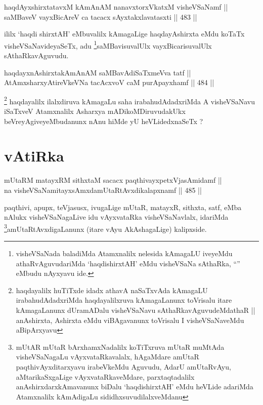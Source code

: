 
\begin{shl}
haqdAyxshirxtatavxM kAmAnAM nanavxtorxVkatxM visheVSaNamf || \\
saMBaveV vayxBicAreV ca tacacx sAyxtakxlavatasxti ||  483 ||  
\end{shl}

\begin{artha}
ililx `haqdi shirxtAH' eMbuvalilx kAmagaLige haqdayAshirxta eMdu
koTaTx visheVSaNavideyaSeTx, adu \footnote{visheVSaNada baladiMda
  Atamxnalilx nelesida kAmagaLU iveyeMdu athaRvAguvudariMda
  `haqdishirxtAH' eMdu visheVSaNa sAthaRka, ``\stext'' eMbudu nAyxyavu ide.}saMBavisuvalUlx
vayxBicarisuvalUlx sAthaRkavAguvudu.
\end{artha}

\begin{shl}
haqdayxnAshirxtakAmAnAM saMBavAdiSaTxmeVva tatf || \\
AtAmxsharxyAtireVkeVNa tacAcxvoV caM purA\s payxhamf ||  484 ||  
\end{shl}

\begin{artha}
\footnote{haqdayalilx huTiTxde idadx athavA naSaTxvAda kAmagaLU
  irabahudAdadxriMda haqdayalilxruva kAmagaLanunx toVrisalu itare
  kAmagaLanunx dUramADalu visheVSaNavu sAthaRkavAguvudeMdathaR ||
  anAshirxta, Ashirxta eMdu viBAgavanunx toVrisalu I visheVSaNaveMdu aBipArxyavu}
haqdayalilx ilalxdiruva kAmagaLu saha irabahudAdadxriMda A
visheVSaNavu iSaTxveV Atamxnalilx Asharxya mADikoMDiruvudakUkx
beVreyAgiveyeMbudanunx nAnu hiMde yU heVLidedxnaSeTx ?
\end{artha}

\section*{vAtiRka}

\begin{shl}
mUtaRM matayxRM sithxtaM sacacx paqthivayxpetxVjasAmidamf || \\
na visheVSaNamitayxsAmxdamUtaRtAvxdikalapxnamf ||  485 ||  
\end{shl}

\begin{artha}
paqthivi, apupx, teVjasusx, ivugaLige mUtaR, matayxR, sithxta, satf,
eMba nAlukx visheVSaNagaLive idu vAyxvataRka visheVSaNavlalx,
idariMda \footnote{mUtAR mUtaR bArxhamxNadalilx koTiTxruva mUtaR
  muMtAda visheVSaNagaLu vAyxvataRkavalalx, hAgaMdare amUtaR
  paqthivAyxditarxyavu irabeVkeMdu Aguvudu, AdarU amUtaRvAyu,
  aMtarikaSxgaLige vAyxvataRkaveMdare, parxtaqtadalilx
  anAshirxdarxkAmavanunx biDalu `haqdishirxtAH' eMdu heVLide adariMda
  Atamxnalilx kAmAdigaLu sididhxsuvudilalxveMdanu}amUtaRtAvxdigaLanunx (itare vAyu AkAshagaLige)
kalipxside. 
\end{artha}

